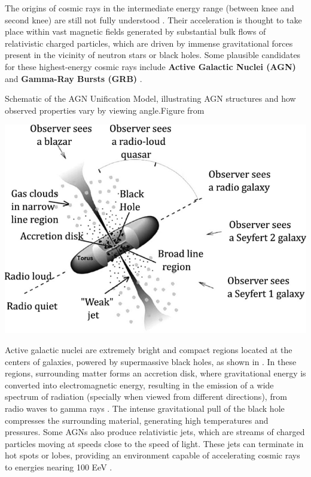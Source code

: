 The origins of cosmic rays in the intermediate energy range (between knee and second knee) are still not fully understood . Their acceleration is thought to take place within vast magnetic fields generated by substantial bulk flows of relativistic charged particles, which are driven by immense gravitational forces present in the vicinity of neutron stars or black holes. Some plausible candidates for these highest-energy cosmic rays include \textbf{Active Galactic Nuclei (AGN)}  and \textbf{Gamma-Ray Bursts (GRB)} . 
\begin{marginfigure}
    \caption{Schematic of the AGN Unification Model, illustrating AGN structures and how observed properties vary by viewing angle.Figure from \cite{AGN_picture}}
    \includegraphics{./figures/nu_he/508900_1_En_8_Fig5_HTML.png}
\end{marginfigure}

Active galactic nuclei are extremely bright and compact regions located at the centers of galaxies, powered by supermassive black holes, as shown in . In these regions, surrounding matter forms an accretion disk, where gravitational energy is converted into electromagnetic energy, resulting in the emission of a wide spectrum of radiation (specially when viewed from different directions), from radio waves to gamma rays . The intense gravitational pull of the black hole compresses the surrounding material, generating high temperatures and pressures. Some AGNs also produce relativistic jets, which are streams of charged particles moving at speeds close to the speed of light. These jets can terminate in hot spots or lobes, providing an environment capable of accelerating cosmic rays to energies nearing 100 EeV . 

